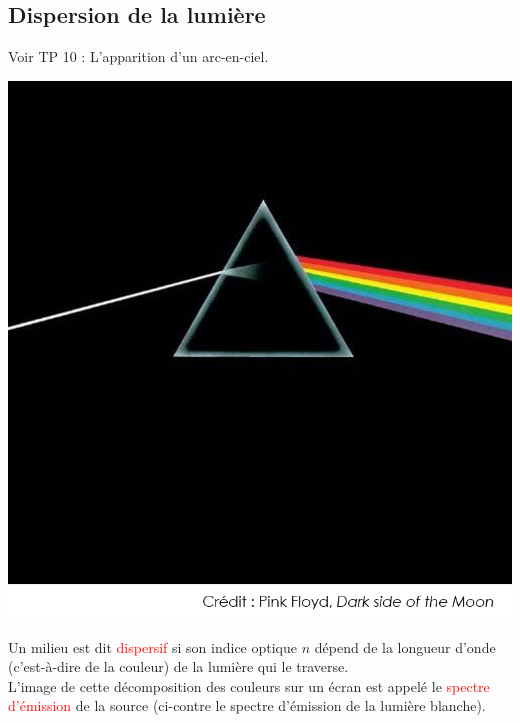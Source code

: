 \subsection{Dispersion de la lumière}
\begin{Large}
\end{Large}
Voir TP 10 : L'apparition d'un arc-en-ciel.
\begin{multicols}{2}
    \begin{center}
        \includegraphics[scale=0.5]{Images/Pink_floyd.png}
    \end{center}
    
    \begin{tcolorbox}[colback=green!5!white,colframe=green!75!black,title=\textbf{Milieu dispersif et spectre:}]
Un milieu est dit \textcolor{red}{dispersif} si son indice optique $n$ dépend de la longueur d'onde (c'est-à-dire de la couleur) de la lumière qui le traverse.\\

L'image de cette décomposition des couleurs sur un écran est appelé le \textcolor{red}{spectre d'émission} de la source (ci-contre le spectre d'émission de la lumière blanche).
\end{tcolorbox}
\end{multicols}


